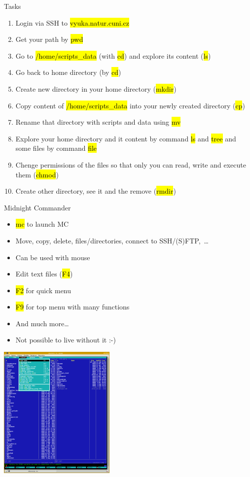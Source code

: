 \documentclass[compress, ucs, xelatex, 11pt, xcolor=svgnames,
  hyperref={
    bookmarks=true,
    unicode=true,
    colorlinks=true,
    pdftitle={Linux, command line and MetaCentrum},
    plainpages=false,
    pdfauthor={Vojtech Zeisek},
    pdfsubject={Course about use of Linux command line, writing shell scripts and using MetaCentrum of CESNET},
    pdfcreator={XeLaTeX},
    pdfkeywords={Linux, GNU, BASH, shell, command line, MetaCentrum},
    linkcolor=DarkRed,
    anchorcolor=DarkBlue,
    citecolor=Indigo,
    filecolor=NavyBlue,
    menucolor=DarkMagenta,
    urlcolor=DarkBlue,
    pdftex},
  url={hyphens, lowtilde} %
  ]{beamer}
\renewcommand{\texttt}[1]{\hl{\ttfamily #1}}
\begin{document}
\begin{frame}{Tasks}
  \begin{enumerate}
    \item Login via SSH to \texttt{vyuka.natur.cuni.cz}
    \item Get your path by \texttt{pwd}
    \item Go to \texttt{/home/scripts\_data} (with \texttt{cd}) and explore its content (\texttt{ls})
    \item Go back to home directory (by \texttt{cd})
    \item Create new directory in your home directory (\texttt{mkdir})
    \item Copy content of \texttt{/home/scripts\_data} into your newly created directory (\texttt{cp})
    \item Rename that directory with scripts and data using \texttt{mv}
    \item Explore your home directory and it content by command \texttt{ls} and \texttt{tree} and some files by command \texttt{file}
    \item Chenge permissions of the files so that only you can read, write and execute them (\texttt{chmod})
    \item Create other directory, see it and the remove (\texttt{rmdir})
  \end{enumerate}
\end{frame}

\begin{frame}{Midnight Commander}
  \begin{multicols}{2}
    \begin{itemize}
      \item \texttt{mc} to launch MC
      \item Move, copy, delete, files/directories, connect to SSH/(S)FTP,~\ldots
      \item Can be used with mouse
      \item Edit text files (\texttt{F4})
      \item \texttt{F2} for quick menu
      \item \texttt{F9} for top menu with many functions
      \item And much more\ldots
      \item Not possible to live without it :-)
    \end{itemize}
    \includegraphics[height=6.5cm]{mc.png}
  \end{multicols}
\end{frame}
\end{document}
